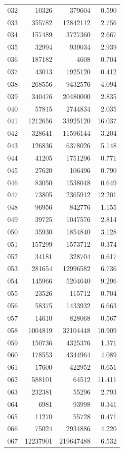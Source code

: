 \documentclass[anonymous,notoc]{gmcm2026}
\begin{document}
\begin{longtable}{lrrr}
032 & 10326 & 379604 & 0.590 \\
033 & 355782 & 12842112 & 2.756 \\
034 & 157489 & 3727360 & 2.667 \\
035 & 32994 & 939034 & 2.939 \\
036 & 187182 & 4608 & 0.704 \\
037 & 43013 & 1925120 & 0.412 \\
038 & 268556 & 9432576 & 4.094 \\
039 & 340476 & 20480000 & 2.835 \\
040 & 57815 & 2744834 & 2.035 \\
041 & 1212656 & 33925120 & 16.037 \\
042 & 328641 & 11596144 & 3.204 \\
043 & 126836 & 6378026 & 5.148 \\
044 & 41205 & 1751296 & 0.771 \\
045 & 27620 & 106496 & 0.790 \\
046 & 83050 & 1538048 & 0.649 \\
047 & 73805 & 2365912 & 12.201 \\
048 & 96956 & 842776 & 1.155 \\
049 & 39725 & 1047576 & 2.814 \\
050 & 35930 & 1854840 & 3.128 \\
051 & 157299 & 1573712 & 0.374 \\
052 & 34181 & 328704 & 0.617 \\
053 & 281654 & 12996582 & 6.736 \\
054 & 145966 & 5204640 & 9.296 \\
055 & 23526 & 115712 & 0.704 \\
056 & 58375 & 1433932 & 6.663 \\
057 & 14610 & 828068 & 0.567 \\
058 & 1004819 & 32104448 & 10.909 \\
059 & 150736 & 4325376 & 1.371 \\
060 & 178553 & 4344964 & 4.089 \\
061 & 17600 & 422952 & 0.651 \\
062 & 588101 & 64512 & 11.411 \\
063 & 232381 & 55296 & 2.793 \\
064 & 6981 & 93998 & 0.341 \\
065 & 11270 & 55728 & 0.471 \\
066 & 75024 & 2934886 & 4.220 \\
067 & 12237901 & 219647488 & 6.532 \\

\end{longtable}
\end{document}
